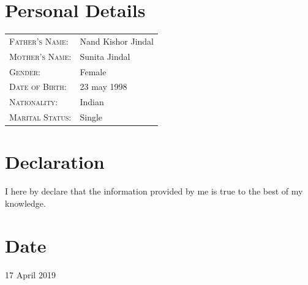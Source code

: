 \documentclass{article}
\begin{document}
	\section{Personal Details}
		\begin{tabular}{ll}\\
			\textsc{Father's Name: }& Nand Kishor Jindal\\
			\textsc{Mother's Name: }&Sunita Jindal\\
			\textsc{Gender: }&Female\\
			\textsc{Date of Birth: }&23 may 1998\\
			\textsc{Nationality: }&Indian\\
			\textsc{Marital Status: }& Single\\
		\end{tabular}
	\section{Declaration}
		I here by declare that the information provided by me is true to the best of my knowledge.
	\section{Date}
		17 April 2019
\end{document}

